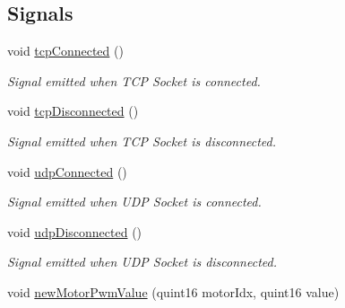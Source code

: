 \subsection*{Signals}
\begin{DoxyCompactItemize}
\item 
\hypertarget{classroboctrl_1_1_robo_controller_s_d_k_a9e70ce536b41424c51bc257609b2c675}{void \hyperlink{classroboctrl_1_1_robo_controller_s_d_k_a9e70ce536b41424c51bc257609b2c675}{tcp\-Connected} ()}\label{classroboctrl_1_1_robo_controller_s_d_k_a9e70ce536b41424c51bc257609b2c675}

\begin{DoxyCompactList}\small\item\em Signal emitted when T\-C\-P Socket is connected. \end{DoxyCompactList}\item 
\hypertarget{classroboctrl_1_1_robo_controller_s_d_k_a3e8a1430f0ceca09a3de31b20f02bb5d}{void \hyperlink{classroboctrl_1_1_robo_controller_s_d_k_a3e8a1430f0ceca09a3de31b20f02bb5d}{tcp\-Disconnected} ()}\label{classroboctrl_1_1_robo_controller_s_d_k_a3e8a1430f0ceca09a3de31b20f02bb5d}

\begin{DoxyCompactList}\small\item\em Signal emitted when T\-C\-P Socket is disconnected. \end{DoxyCompactList}\item 
\hypertarget{classroboctrl_1_1_robo_controller_s_d_k_a1c0dbdb62596097a64755fd12670f980}{void \hyperlink{classroboctrl_1_1_robo_controller_s_d_k_a1c0dbdb62596097a64755fd12670f980}{udp\-Connected} ()}\label{classroboctrl_1_1_robo_controller_s_d_k_a1c0dbdb62596097a64755fd12670f980}

\begin{DoxyCompactList}\small\item\em Signal emitted when U\-D\-P Socket is connected. \end{DoxyCompactList}\item 
\hypertarget{classroboctrl_1_1_robo_controller_s_d_k_afefc46c540948597ca05deccac69aceb}{void \hyperlink{classroboctrl_1_1_robo_controller_s_d_k_afefc46c540948597ca05deccac69aceb}{udp\-Disconnected} ()}\label{classroboctrl_1_1_robo_controller_s_d_k_afefc46c540948597ca05deccac69aceb}

\begin{DoxyCompactList}\small\item\em Signal emitted when U\-D\-P Socket is disconnected. \end{DoxyCompactList}\item 
\hypertarget{classroboctrl_1_1_robo_controller_s_d_k_ad86055b34f7c153550ad6984eb527b43}{void \hyperlink{classroboctrl_1_1_robo_controller_s_d_k_ad86055b34f7c153550ad6984eb527b43}{new\-Motor\-Pwm\-Value} (quint16 motor\-Idx, quint16 value)}\label{classroboctrl_1_1_robo_controller_s_d_k_ad86055b34f7c153550ad6984eb527b43}


\end{DoxyCompactItemize}
